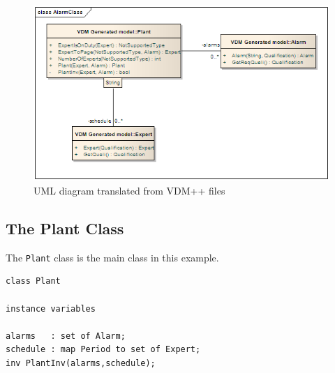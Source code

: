 \begin{figure}[!h]
\begin{center}
  \includegraphics[width=5in]{figures/UMLFromVDM}
  \caption[labelInTOC]{UML diagram translated from VDM++ files}
  \label{fig:finalumlforalarm}
\end{center}
\end{figure}


\subsection{The Plant Class}

The \texttt{Plant} class is the main class in this example. 

\begin{lstlisting}
class Plant

instance variables

alarms   : set of Alarm;
schedule : map Period to set of Expert;
inv PlantInv(alarms,schedule);
\end{lstlisting}


